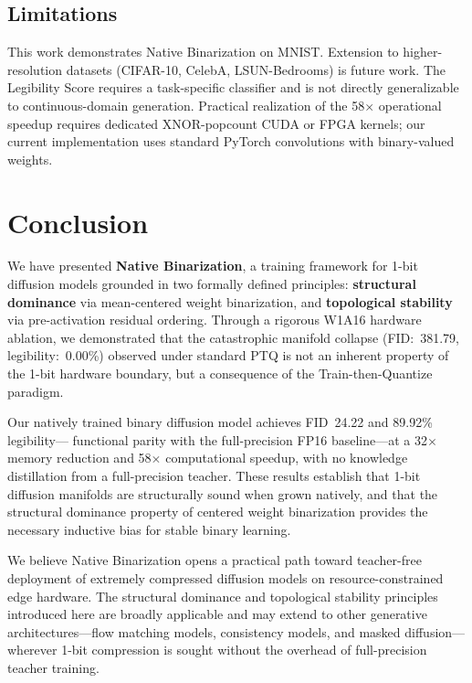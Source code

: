 \documentclass[conference]{IEEEtran}
\begin{document}
\subsection{Limitations}

This work demonstrates Native Binarization on MNIST. Extension to higher-resolution
datasets (CIFAR-10, CelebA, LSUN-Bedrooms) is future work. The Legibility Score requires
a task-specific classifier and is not directly generalizable to continuous-domain
generation. Practical realization of the 58$\times$ operational speedup requires
dedicated XNOR-popcount CUDA or FPGA kernels; our current implementation uses standard
PyTorch convolutions with binary-valued weights.

\section{Conclusion}

We have presented \textbf{Native Binarization}, a training framework for 1-bit diffusion
models grounded in two formally defined principles: \textbf{structural dominance} via
mean-centered weight binarization, and \textbf{topological stability} via pre-activation
residual ordering. Through a rigorous W1A16 hardware ablation, we demonstrated that the
catastrophic manifold collapse (FID:~381.79, legibility:~0.00\%) observed under standard
PTQ is not an inherent property of the 1-bit hardware boundary, but a consequence of the
Train-then-Quantize paradigm.

Our natively trained binary diffusion model achieves FID~24.22 and 89.92\% legibility---
functional parity with the full-precision FP16 baseline---at a 32$\times$ memory
reduction and 58$\times$ computational speedup, with no knowledge distillation from a
full-precision teacher. These results establish that 1-bit diffusion manifolds are
structurally sound when grown natively, and that the structural dominance property of
centered weight binarization provides the necessary inductive bias for stable binary
learning.

We believe Native Binarization opens a practical path toward teacher-free deployment of
extremely compressed diffusion models on resource-constrained edge hardware. The
structural dominance and topological stability principles introduced here are broadly
applicable and may extend to other generative architectures---flow matching models,
consistency models, and masked diffusion---wherever 1-bit compression is sought without
the overhead of full-precision teacher training.



\end{document}
